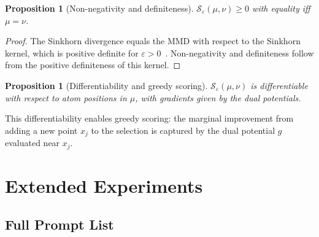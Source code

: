 \documentclass[10pt]{article}
\newtheorem{proposition}[theorem]{Proposition}
\begin{document}
\begin{proposition}[Non-negativity and definiteness]
$\mathcal{S}_\varepsilon(\mu, \nu) \geq 0$ with equality iff $\mu = \nu$.
\end{proposition}

\begin{proof}
The Sinkhorn divergence equals the MMD with respect to the Sinkhorn kernel, which is positive definite for $\varepsilon > 0$~\citep{feydy2019interpolating}.
Non-negativity and definiteness follow from the positive definiteness of this kernel.
\end{proof}

\begin{proposition}[Differentiability and greedy scoring]
$\mathcal{S}_\varepsilon(\mu, \nu)$ is differentiable with respect to atom positions in $\mu$, with gradients given by the dual potentials.
\end{proposition}

This differentiability enables greedy scoring: the marginal improvement from adding a new point $x_j$ to the selection is captured by the dual potential $g$ evaluated near $x_j$.

\section{Extended Experiments}
\label{app:extended}

\subsection{Full Prompt List}
\end{document}
